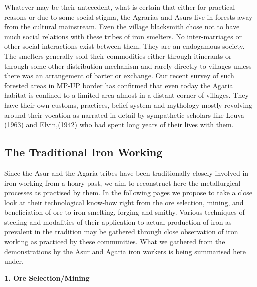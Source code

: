 Whatever may be their antecedent, what is certain that either for practical reasons or due to some social stigma, the Agrarias and Asurs live in forests away from the cultural mainstream. Even the village blacksmith chose not to have much social relations with these tribes of iron smelters. No inter-marriages or other social interactions exist between them. They are an endogamous society. The smelters generally sold their commodities either through itinerants or through some other distribution mechanism and rarely directly to villages unless there was an arrangement of barter or exchange. Our recent survey of such forested areas in MP-UP border has confirmed that even today the Agaria habitat is confined to a limited area almost in a distant corner of villages. They have their own customs, practices, belief system and mythology mostly revolving around their vocation as narrated in detail by sympathetic scholars like Leuva (1963) and Elvin,(1942) who had spent long years of their lives with them. 

\vspace{-.3cm}

\subsection*{The Traditional Iron Working}\label{chapter7-subsection-7.1a}

\vspace{-.2cm}

Since the Asur and the Agaria tribes have been traditionally closely involved in iron working from a hoary past, we aim to reconstruct here the metallurgical processes as practised by them. In the following pages we propose to take a close look at their technological know-how right from the ore selection, mining, and beneficiation of ore to iron smelting, forging and smithy. Various techniques of steeling and modalities of their application to actual production of iron as prevalent in the tradition may be gathered through close observation of iron working as practiced by these communities. What we gathered from the demonstrations by the Asur and Agaria iron workers is being summarised here under.

\noindent \textbf{\large 1. Ore Selection/Mining}

